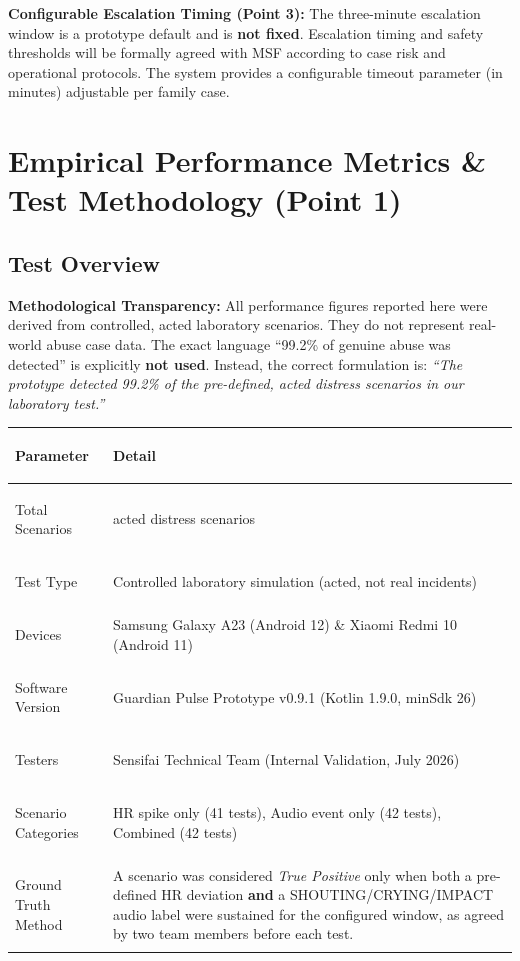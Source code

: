 \documentclass[12pt,a4paper]{article}
\begin{document}
\begin{warningbox}
\textbf{Configurable Escalation Timing (Point 3):} The three-minute escalation window is a prototype default and is \textbf{not fixed}. Escalation timing and safety thresholds will be formally agreed with MSF according to case risk and operational protocols. The system provides a configurable timeout parameter (in minutes) adjustable per family case.
\end{warningbox}

\section{Empirical Performance Metrics \& Test Methodology (Point 1)}

\subsection{Test Overview}
\begin{warningbox}
\textbf{Methodological Transparency:} All performance figures reported here were derived from controlled, acted laboratory scenarios. They do not represent real-world abuse case data. The exact language ``99.2\% of genuine abuse was detected'' is explicitly \textbf{not used}. Instead, the correct formulation is: \textit{``The prototype detected 99.2\% of the pre-defined, acted distress scenarios in our laboratory test.''}
\end{warningbox}

\begin{table}[h]
\centering
\renewcommand{\arraystretch}{1.4}
\begin{tabularx}{\textwidth}{@{} >{\bfseries\raggedright\arraybackslash}p{3.5cm} >{\raggedright\arraybackslash}X @{}}
\toprule
\textbf{Parameter} & \textbf{Detail} \\
\midrule
Total Scenarios & 125 acted distress scenarios \\
Test Type & Controlled laboratory simulation (acted, not real incidents) \\
Devices & Samsung Galaxy A23 (Android 12) \& Xiaomi Redmi 10 (Android 11) \\
Software Version & Guardian Pulse Prototype v0.9.1 (Kotlin 1.9.0, minSdk 26) \\
Testers & Sensifai Technical Team (Internal Validation, July 2026) \\
Scenario Categories & HR spike only (41 tests), Audio event only (42 tests), Combined (42 tests) \\
Ground Truth Method & A scenario was considered \textit{True Positive} only when both a pre-defined HR deviation \textbf{and} a SHOUTING/CRYING/IMPACT audio label were sustained for the configured window, as agreed by two team members before each test. \\
\bottomrule
\end{tabularx}
\end{table}
\end{document}
